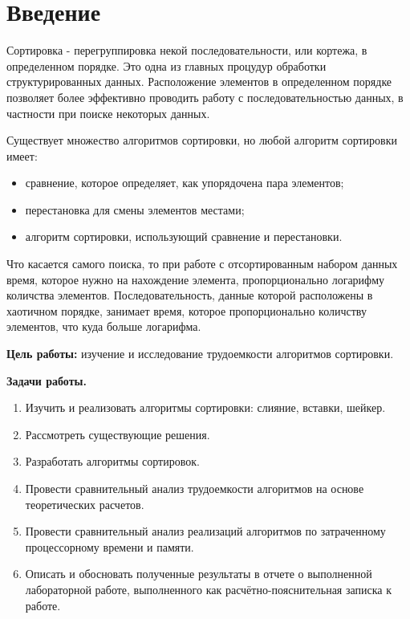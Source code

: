 \chapter*{Введение}

Сортировка - перегруппировка некой последовательности, или кортежа, в определенном порядке. Это одна из главных процудур обработки структурированных данных. Расположение элементов в определенном порядке позволяет более эффективно проводить работу с последовательностью данных, в частности при поиске некоторых данных. \newline

Существует множество алгоритмов сортировки, но любой алгоритм сортировки имеет:
\begin{itemize}
	\item сравнение, которое определяет, как упорядочена пара элементов;
    \item перестановка для смены элементов местами;
    \item алгоритм сортировки, использующий сравнение и перестановки. \newline
\end{itemize}

Что касается самого поиска, то при работе с отсортированным набором данных время, которое нужно на нахождение элемента, пропорционально логарифму количства элементов. Последовательность, данные которой расположены в хаотичном порядке, занимает время, которое пропорционально количству элементов, что куда больше логарифма. \newline

\textbf{Цель работы:} изучение и исследование трудоемкости алгоритмов сортировки. \newline

\textbf{Задачи работы.}
\begin{enumerate}
	\item Изучить и реализовать алгоритмы сортировки: слияние, вставки, шейкер.
    \item Рассмотреть существующие решения.
    \item Разработать алгоритмы сортировок.
    \item Провести сравнительный анализ трудоемкости алгоритмов на основе теоретических расчетов.
    \item Провести сравнительный анализ реализаций алгоритмов по затраченному процессорному времени и памяти.
	\item Описать и обосновать полученные результаты в отчете о выполненной лабораторной работе, выполненного как расчётно-пояснительная записка к работе.
\end{enumerate}